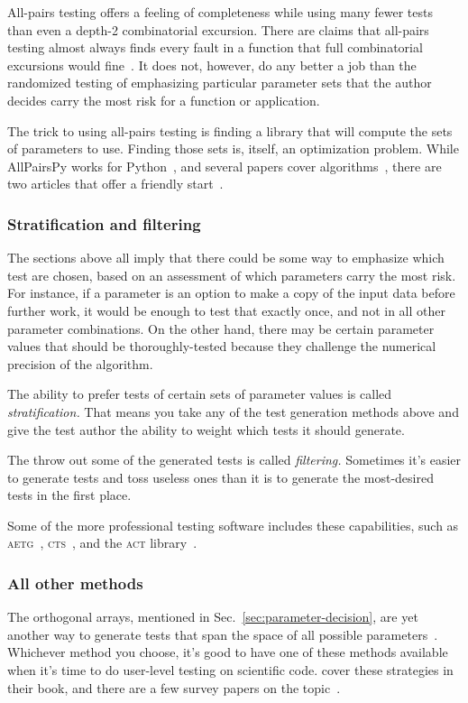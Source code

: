 \documentclass[fleqn,10pt]{olplainarticle}
\begin{document}
All-pairs testing offers a feeling of completeness while
using many fewer tests than even a depth-2 combinatorial
excursion. There are claims that all-pairs testing almost
always finds every fault in a function that full combinatorial
excursions would fine~\citep{Pairwise}. It does not, however,
do any better a job than the randomized testing of emphasizing
particular parameter sets that the author decides carry
the most risk for a function or application.

The trick to using all-pairs testing is finding a library
that will compute the sets of parameters to use. Finding
those sets is, itself, an optimization problem.
While AllPairsPy works for Python~\citep{allpairspy},
and several papers cover algorithms~\citep{tung2000automating,pezze2008},
there are two articles that offer a friendly start~\citep{blass2002,czerwoka2006}.


\subsubsection{Stratification and filtering}\label{sec:parameters-stratification}
The sections above all imply that there could be some way
to emphasize which test are chosen, based on an assessment
of which parameters carry the most risk. For instance, if
a parameter is an option to make a copy of the input data
before further work, it would be enough to test that exactly
once, and not in all other parameter combinations. On
the other hand, there may
be certain parameter values that should be thoroughly-tested
because they challenge the numerical precision of the algorithm.

The ability to prefer tests of certain sets of parameter values
is called \emph{stratification.} That means you take any
of the test generation methods above and give the test author
the ability to weight which tests it should generate.

The throw out some of the generated tests is called
\emph{filtering.} Sometimes it's easier to generate tests
and toss useless ones than it is to generate the most-desired
tests in the first place.

Some of the more professional testing software includes
these capabilities, such as \textsc{aetg}~\citep{cohen1997aetg},
\textsc{cts}~\citep{hartman2004problems},
and the \textsc{act} library~\citep{kuhn2008automated}.


\subsubsection{All other methods}
The orthogonal arrays, mentioned in Sec.~\ref{sec:parameter-decision},
are yet another way to generate tests that span the space of
all possible parameters~\citep{Owen1992}.
Whichever method you choose, it's
good to have one of these methods available when it's time to
do user-level testing on scientific code.
\citet{petke2015practical} cover these strategies in their book,
and there are a few survey papers on the topic~\citep{grindal2005,nie2011survey,khalsa2014orchestrated}.
\end{document}
